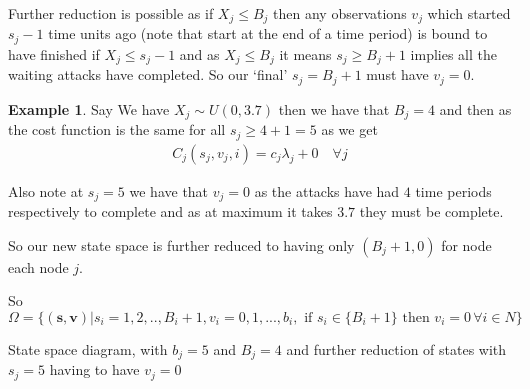 \documentclass[a4paper,10pt]{article}
\theoremstyle{definition}
\theoremstyle{definition}
\newtheorem{example}[theorem]{Example}
\theoremstyle{remark}
\theoremstyle{definition}
\begin{document}
Further reduction is possible as if $X_{j} \leq B_{j}$ then any observations $v_{j}$ which started $s_{j}-1$ time units ago (note that start at the end of a time period) is bound to have finished if $X_{j} \leq s_{j}-1$ and as $X_{j} \leq B_{j}$ it means $s_{j} \geq B_{j}+1$ implies all the waiting attacks have completed. So our `final' $s_{j}=B_{j}+1$ must have $v_{j}=0$.

\begin{example}
Say We have $X_{j} \sim U(0,3.7)$ then we have that $B_{j}=4$ and then as the cost function is the same for all $s_{j} \geq 4+1=5$ as we get
\begin{align*}
C_{j}(s_{j},v_{j},i)= c_{j} \lambda_{j}+0 \quad \forall j
\end{align*}

Also note at $s_{j}=5$ we have that $v_{j}=0$ as the attacks have had $4$ time periods respectively to complete and as at maximum it takes $3.7$ they must be complete.
\end{example}

So our new state space is further reduced to having only $(B_{j}+1,0)$ for node each node $j$.

So $\Omega= \{ (\bm{s},\bm{v}) | s_{i}=1,2,..,B_{i}+1 , v_{i}=0,1,...,b_{i} , \text{ if } s_{i} \in \{B_{i}+1 \} \text{ then } v_{i}=0 \, \forall i \in N \}$

\begin{myfigure}
\begin{center}
\end{center}
\caption{State space diagram, with $b_{j}=5$ and $B_{j}=4$ and further reduction of states with $s_{j}=5$ having to have $v_{j}=0$}
\end{myfigure}
\end{document}
